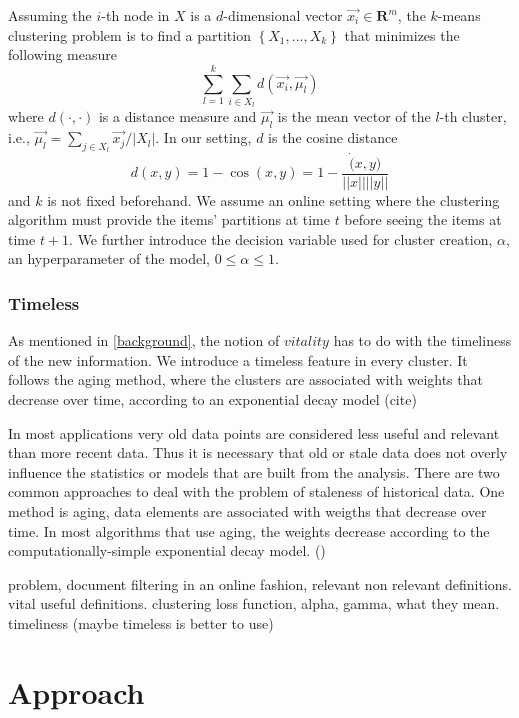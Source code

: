 \documentclass{article}
\begin{document}
Assuming the $i$-th node in $X$ is a $d$-dimensional vector $\vec{x_i} \in \mathbf{R}^m$, the $k$-means clustering problem is to find a partition $\left\{ {X_1, ..., X_k}\right\}$ that minimizes the following measure
\begin{equation}
\sum_{l=1}^{k} \sum_{i \in X_l} d(\vec{x_i},\vec{\mu_l})
\end{equation}
where $d(\cdot,\cdot)$ is a distance measure and $\vec{\mu_l}$ is the mean vector of the $l$-th cluster, i.e., $\vec{\mu_l} = \sum_{j \in X_l}{\vec{x_j}/|X_l|}$.
In our setting, $d$ is the cosine distance
\begin{equation}
d(x,y) = 1 - \cos(x,y) = 1 - \frac{\dot(x,y)}{||x||||y||}
\end{equation}
and $k$ is not fixed beforehand.
We assume an online setting where the clustering algorithm must provide the items' partitions at time $t$ before seeing the items at time $t+1$. We further introduce the decision variable used for cluster creation, $\alpha$, an hyperparameter of the model, $0 \leq \alpha \leq 1$.

\subsubsection{Timeless}

As mentioned in \ref{background}, the notion of $vitality$ has to do with the timeliness of the new information. We introduce a timeless feature in every cluster. It follows the aging method, where the clusters are associated with weights that decrease over time, according to an exponential decay model (cite)

In most applications very old data points are considered less useful and relevant than more recent data. Thus it is necessary that old or stale data does not overly influence the statistics or models that are built from the analysis. There are two common approaches to deal with the problem of staleness of historical data. One method is aging, data elements are associated with weigths that decrease over time. In most algorithms that use aging, the weights decrease according to the computationally-simple exponential decay model. ()


problem, document filtering in an online fashion, 
relevant non relevant definitions.
vital useful definitions.
clustering loss function, alpha, gamma, what they mean.
timeliness (maybe timeless is better to use)

\section{Approach}
\label{approach}
\end{document}
